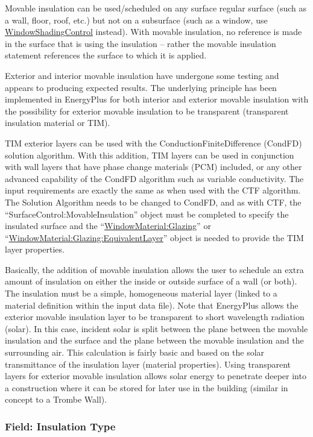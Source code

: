 Movable insulation can be used/scheduled on any surface regular surface (such as a wall, floor, roof, etc.) but not on a subsurface (such as a window, use \hyperref[windowpropertyshadingcontrol]{WindowShadingControl} instead). With movable insulation, no reference is made in the surface that is using the insulation -- rather the movable insulation statement references the surface to which it is applied.

Exterior and interior movable insulation have undergone some testing and appears to producing expected results. The underlying principle has been implemented in EnergyPlus for both interior and exterior movable insulation with the possibility for exterior movable insulation to be transparent (transparent insulation material or TIM).

TIM exterior layers can be used with the ConductionFiniteDifference (CondFD) solution algorithm. With this addition, TIM layers can be used in conjunction with wall layers that have phase change materials (PCM) included, or any other advanced capability of the CondFD algorithm such as variable conductivity. The input requirements are exactly the same as when used with the CTF algorithm. The Solution Algorithm needs to be changed to CondFD, and as with CTF, the ``SurfaceControl:MovableInsulation'' object must be completed to specify the insulated surface and the ``\hyperref[windowmaterialglazing]{WindowMaterial:Glazing}'' or ``\hyperref[windowmaterialglazingequivalentlayer]{WindowMaterial:Glazing:EquivalentLayer}'' object is needed to provide the TIM layer properties.

Basically, the addition of movable insulation allows the user to schedule an extra amount of insulation on either the inside or outside surface of a wall (or both). The insulation must be a simple, homogeneous material layer (linked to a material definition within the input data file). Note that EnergyPlus allows the exterior movable insulation layer to be transparent to short wavelength radiation (solar). In this case, incident solar is split between the plane between the movable insulation and the surface and the plane between the movable insulation and the surrounding air. This calculation is fairly basic and based on the solar transmittance of the insulation layer (material properties). Using transparent layers for exterior movable insulation allows solar energy to penetrate deeper into a construction where it can be stored for later use in the building (similar in concept to a Trombe Wall).

\subsubsection{Field: Insulation Type}\label{field-insulation-type}


